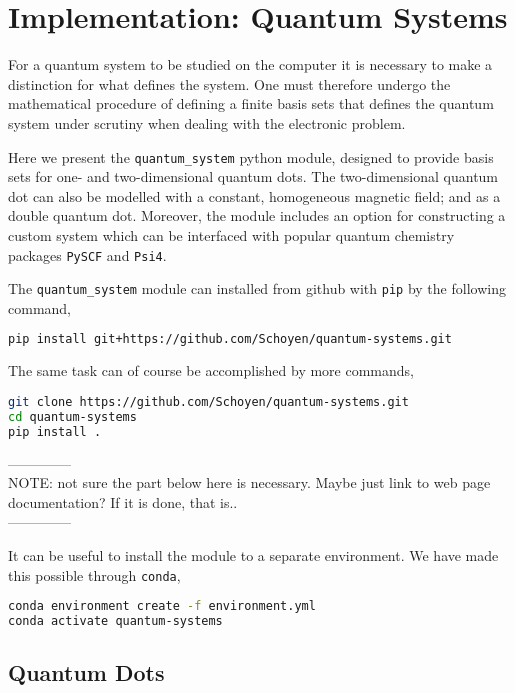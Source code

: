 \chapter{Implementation: Quantum Systems}

For a quantum system to be studied on the computer it is necessary to 
make a distinction for what defines the system. One must therefore undergo the
mathematical procedure of defining a finite basis sets that defines the 
quantum system under scrutiny when dealing with the electronic problem. 

Here we present the \lstinline{quantum_system} python module, designed to 
provide basis sets for one- and two-dimensional quantum dots. The two-dimensional 
quantum dot can also be modelled with a constant, homogeneous magnetic field; and 
as a double quantum dot. 
Moreover, the module includes an option for constructing a custom system which can 
be interfaced with popular quantum chemistry packages \lstinline{PySCF}\cite{PYSCF} 
and \lstinline{Psi4}\cite{parrish2017psi4}.

The \lstinline{quantum_system} module can installed from github with \lstinline{pip}
by the following command,
\begin{lstlisting}[language=bash]
pip install git+https://github.com/Schoyen/quantum-systems.git
\end{lstlisting}
The same task can of course be accomplished by more commands,
\begin{lstlisting}[language=bash]
git clone https://github.com/Schoyen/quantum-systems.git
cd quantum-systems
pip install .
\end{lstlisting}

\noindent
--------------\\
NOTE: not sure the part below here is necessary. Maybe just link to web page 
documentation? If it is done, that is.. \\
--------------

It can be useful to install the module to a separate environment. We have made this 
possible through \lstinline{conda},
\begin{lstlisting}[language=bash]
conda environment create -f environment.yml
conda activate quantum-systems    
\end{lstlisting}

\section{Quantum Dots}


